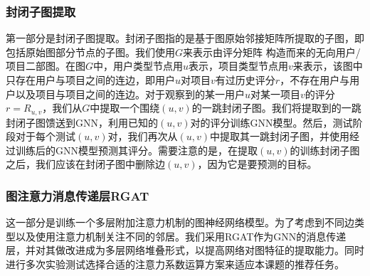 \documentclass{ctexart}
\begin{document}
\subsubsection{封闭子图提取}
第一部分是封闭子图提取。封闭子图指的是基于图原始邻接矩阵所提取的子图，即包括原始图部分节点的子图。我们使用$G$来表示由评分矩阵 构造而来的无向用户/项目二部图。在图$G$中，用户类型节点用$u$表示，项目类型节点用$v$来表示，该图中只存在用户与项目之间的连边，即用户$u$对项目$v$有过历史评分$r$，不存在用户与用户以及项目与项目之间的连边。对于观察到的某一用户$u$对某一项目$v$的评分$r=R_{u,v}$，我们从$G$中提取一个围绕$(u,v)$的一跳封闭子图。我们将提取到的一跳封闭子图馈送到GNN，利用已知的$(u,v)$对的评分训练GNN模型。然后，测试阶段对于每个测试$(u,v)$对，我们再次从$(u,v)$中提取其一跳封闭子图，并使用经过训练后的GNN模型预测其评分。需要注意的是，在提取$(u,v)$的训练封闭子图之后，我们应该在封闭子图中删除边$(u,v)$，因为它是要预测的目标。

\subsubsection{图注意力消息传递层RGAT}
这一部分是训练一个多层附加注意力机制的图神经网络模型。为了考虑到不同边类型以及使用注意力机制关注不同的邻居。我们采用RGAT作为GNN的消息传递层，并对其做改进成为多层网络堆叠形式，以提高网络对图特征的提取能力。同时进行多次实验测试选择合适的注意力系数运算方案来适应本课题的推荐任务。
\end{document}
